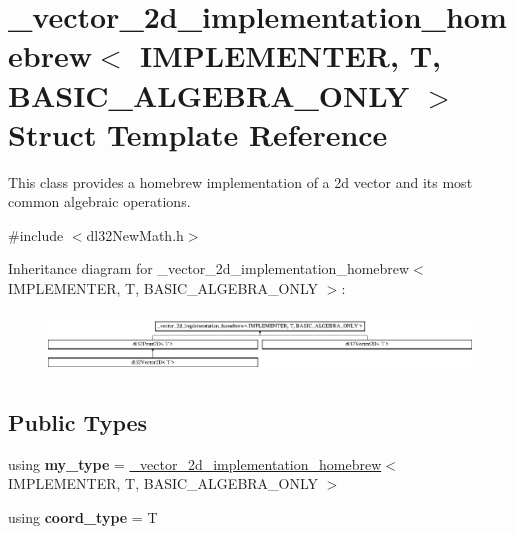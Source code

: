 \hypertarget{struct__vector__2d__implementation__homebrew}{\section{\-\_\-vector\-\_\-2d\-\_\-implementation\-\_\-homebrew$<$ I\-M\-P\-L\-E\-M\-E\-N\-T\-E\-R, T, B\-A\-S\-I\-C\-\_\-\-A\-L\-G\-E\-B\-R\-A\-\_\-\-O\-N\-L\-Y $>$ Struct Template Reference}
\label{struct__vector__2d__implementation__homebrew}
}


This class provides a homebrew implementation of a 2d vector and its most common algebraic operations.  




{\ttfamily \#include $<$dl32\-New\-Math.\-h$>$}

Inheritance diagram for \-\_\-vector\-\_\-2d\-\_\-implementation\-\_\-homebrew$<$ I\-M\-P\-L\-E\-M\-E\-N\-T\-E\-R, T, B\-A\-S\-I\-C\-\_\-\-A\-L\-G\-E\-B\-R\-A\-\_\-\-O\-N\-L\-Y $>$\-:\begin{figure}[H]
\begin{center}
\leavevmode
\includegraphics[height=1.618497cm]{struct__vector__2d__implementation__homebrew}
\end{center}
\end{figure}
\subsection*{Public Types}
\begin{DoxyCompactItemize}
\item 
\hypertarget{struct__vector__2d__implementation__homebrew_a5f9db55a33ee3c3f9b378b0a09d4adc4}{using {\bfseries my\-\_\-type} = \hyperlink{struct__vector__2d__implementation__homebrew}{\-\_\-vector\-\_\-2d\-\_\-implementation\-\_\-homebrew}$<$ I\-M\-P\-L\-E\-M\-E\-N\-T\-E\-R, T, B\-A\-S\-I\-C\-\_\-\-A\-L\-G\-E\-B\-R\-A\-\_\-\-O\-N\-L\-Y $>$}\label{struct__vector__2d__implementation__homebrew_a5f9db55a33ee3c3f9b378b0a09d4adc4}

\item 
\hypertarget{struct__vector__2d__implementation__homebrew_a542e040d8e079709d8cc8cbd7906fd7c}{using {\bfseries coord\-\_\-type} = T}\label{struct__vector__2d__implementation__homebrew_a542e040d8e079709d8cc8cbd7906fd7c}

\end{DoxyCompactItemize}
